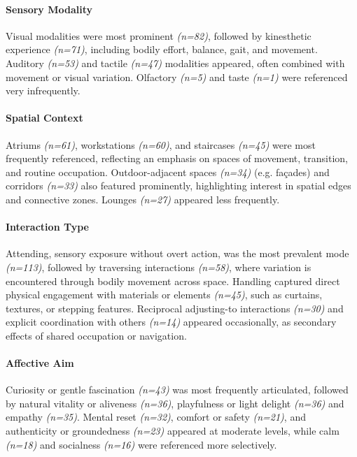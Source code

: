 \paragraph{Sensory Modality}
Visual modalities were most prominent \emph{(n=82)}, followed by kinesthetic experience \emph{(n=71)}, including bodily effort, balance, gait, and movement. Auditory \emph{(n=53)} and tactile \emph{(n=47)} modalities appeared, often combined with movement or visual variation. Olfactory \emph{(n=5)} and taste \emph{(n=1)} were referenced very infrequently. 

\paragraph{Spatial Context}
Atriums \emph{(n=61)}, workstations \emph{(n=60)}, and staircases \emph{(n=45)} were most frequently referenced, reflecting an emphasis on spaces of movement, transition, and routine occupation. Outdoor-adjacent spaces \emph{(n=34)} (e.g. fa\c{c}ades) and corridors \emph{(n=33)} also featured prominently, highlighting interest in spatial edges and connective zones. Lounges \emph{(n=27)} appeared less frequently. 

\paragraph{Interaction Type}
Attending, sensory exposure without overt action, was the most prevalent mode \emph{(n=113)}, followed by traversing interactions \emph{(n=58)}, where variation is encountered through bodily movement across space. Handling captured direct physical engagement with materials or elements \emph{(n=45)}, such as curtains, textures, or stepping features. Reciprocal adjusting-to interactions \emph{(n=30)} and explicit coordination with others \emph{(n=14)} appeared occasionally, as secondary effects of shared occupation or navigation. 

\paragraph{Affective Aim}
Curiosity or gentle fascination \emph{(n=43)} was most frequently articulated, followed by natural vitality or aliveness \emph{(n=36)}, playfulness or light delight \emph{(n=36)} and empathy \emph{(n=35)}. Mental reset \emph{(n=32)}, comfort or safety \emph{(n=21)}, and authenticity or groundedness \emph{(n=23)} appeared at moderate levels, while calm \emph{(n=18)} and socialness \emph{(n=16)} were referenced more selectively. 

